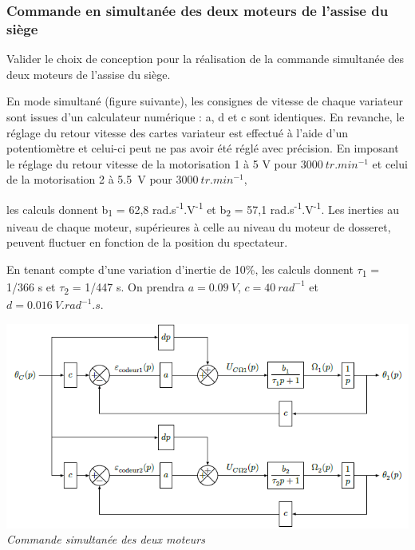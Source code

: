 \documentclass[10pt,fleqn]{article} %
\begin{document}
\begin{multicols}{2}
\subsubsection{Commande en simultanée des deux moteurs de l'assise du siège}

\begin{obj}

Valider le choix de conception pour la réalisation de la commande simultanée des deux moteurs de l'assise du siège.
\end{obj}

En mode simultané (figure suivante), les consignes de vitesse de chaque
variateur sont issues d'un calculateur numérique : a, d et c sont
identiques. En revanche, le réglage du retour vitesse des cartes
variateur est effectué à l'aide d'un potentiomètre et celui-ci peut ne
pas avoir été réglé avec précision. En imposant le réglage du retour
vitesse de la motorisation 1 à 5 V pour $\SI{3000}{tr.min^{-1}}$
et celui de la motorisation 2 à \SI{5,5}{V} pour $\SI{3000}{tr. min^{-1}}$,

les calculs donnent b\textsubscript{1} = 62,8
rad.s\textsuperscript{-1}.V\textsuperscript{-1} et b\textsubscript{2} =
57,1 rad.s\textsuperscript{-1}.V\textsuperscript{-1}. Les inerties au
niveau de chaque moteur, supérieures à celle au niveau du moteur de
dosseret, peuvent fluctuer en fonction de la position du spectateur.

En tenant compte d'une variation d'inertie de 10\%, les calculs donnent
$\tau$\textsubscript{1} = 1/366 s et $\tau$\textsubscript{2} = 1/447 s. On prendra
$a =\SI{0,09}{V}$, $c =\SI{40}{rad^{-1}}$ et $d = \SI{0,016}{V.rad^{-1}.s}$.


\begin{center}
\includegraphics[width=1.0\linewidth]{images/image20.png}
\textit{Commande simultanée des deux moteurs \label{fig19}}
\end{center}



\end{multicols}
\end{document}
